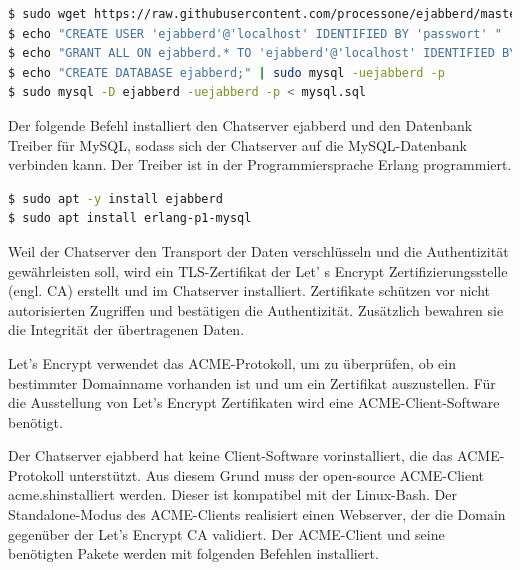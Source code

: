 \documentclass[a4paper,titlepage,halfparskip,12pt]{scrreprt}
\begin{document}
\begin{onehalfspacing}
\bigskip

 \begin{lstlisting}[language=bash, caption={Installation der Mysql-Datenbank}]
$ sudo wget https://raw.githubusercontent.com/processone/ejabberd/master/sql/mysql.sql
$ echo "CREATE USER 'ejabberd'@'localhost' IDENTIFIED BY 'passwort' " | sudo mysql -uroot
$ echo "GRANT ALL ON ejabberd.* TO 'ejabberd'@'localhost' IDENTIFIED BY 'passwort';" | sudo mysql -uroot
$ echo "CREATE DATABASE ejabberd;" | sudo mysql -uejabberd -p
$ sudo mysql -D ejabberd -uejabberd -p < mysql.sql
\end{lstlisting}



Der folgende Befehl installiert den Chatserver ejabberd und den Datenbank Treiber für MySQL, sodass sich der Chatserver auf die MySQL-Datenbank verbinden kann. Der Treiber ist in der Programmiersprache Erlang programmiert.

\bigskip

\begin{lstlisting}[language=bash, caption={Installation von ejabberd und des MySQL Datenbanktreibers}]
$ sudo apt -y install ejabberd
$ sudo apt install erlang-p1-mysql
\end{lstlisting}

Weil der Chatserver den Transport der Daten verschlüsseln und die Authentizität gewährleisten soll, wird ein TLS-Zertifikat der Let' s Encrypt Zertifizierungsstelle (engl. \ac{CA}) erstellt und im Chatserver installiert. Zertifikate schützen vor nicht autorisierten Zugriffen und bestätigen die Authentizität. Zusätzlich bewahren sie die Integrität der übertragenen Daten.\cite{melzer2010web}

Let's Encrypt verwendet das ACME-Protokoll, um zu überprüfen, ob ein bestimmter Domainname vorhanden ist und um ein Zertifikat auszustellen. Für die Ausstellung von Let's Encrypt Zertifikaten wird eine ACME-Client-Software benötigt.\cite{letsencryptACME}

Der Chatserver ejabberd hat keine Client-Software vorinstalliert, die das ACME-Protokoll unterstützt. Aus diesem Grund muss der open-source ACME-Client \glqq acme.sh\grqq installiert werden. Dieser ist kompatibel mit der Linux-Bash. Der Standalone-Modus des ACME-Clients realisiert einen Webserver, der die Domain gegenüber der Let's Encrypt \ac{CA} validiert.\cite{acmeshOfficial}
Der ACME-Client und seine benötigten Pakete werden mit folgenden Befehlen installiert.

\bigskip


\end{onehalfspacing}
\end{document}
